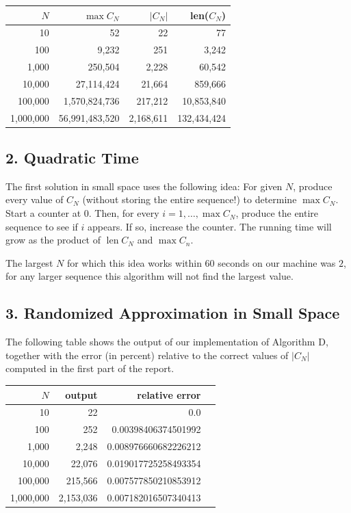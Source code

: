 \documentclass{tufte-handout}
\begin{document}
\medskip
\begin{tabular}{rrrr}
	\toprule
	$N$ & $\max C_N$ & $|C_N|$ & len($C_N$) \\
	\midrule
	10 & 52 & 22 & 77 \\
	100 & 9,232 & 251 & 3,242 \\
	1,000 & 250,504 & 2,228 & 60,542 \\
	10,000 & 27,114,424 & 21,664 & 859,666 \\
	100,000 & 1,570,824,736 & 217,212 & 10,853,840 \\
	1,000,000 & 56,991,483,520 & 2,168,611 & 132,434,424 \\
	\bottomrule
\end{tabular}


\subsection{2. Quadratic Time}

The first solution in small space uses the following idea: For given
$N$, produce every value of $C_N$ (without storing the entire
sequence!)
to determine $\max C_N$.
Start a counter at 0.
Then, for every $i=1,\ldots, \max C_N$, produce the entire sequence to
see if $i$ appears.
If so, increase the counter.
The running time will grow as the product of $\operatorname{len}C_N$ and $ \max C_n$.

The largest $N$ for which this idea works within 60 seconds on our
machine was $2$, for any larger sequence this algorithm will not find the largest value.


\subsection{3. Randomized Approximation in Small Space}

The following table shows the output of our implementation of
Algorithm D, together with the error (in percent) relative to the
correct values of $|C_N|$ computed in the first part of the report.

\medskip
\begin{tabular}{rrrr}
  \toprule
  $N$ &   output & relative error \\
  \midrule
  10 & 22 & 0.0 \\
  100 & 252 & 0.00398406374501992 \\
  1,000 & 2,248 & 0.008976660682226212\\
  10,000 & 22,076 & 0.019017725258493354 \\
  100,000 & 215,566 & 0.007577850210853912 \\
  1,000,000 & 2,153,036 & 0.007182016507340413 \\
  \bottomrule
\end{tabular}
\end{document}
